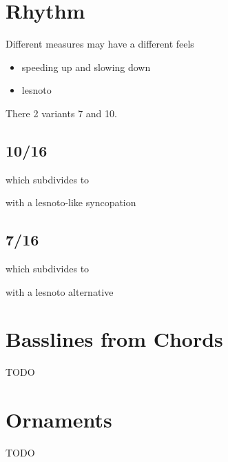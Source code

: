 

\section{Rhythm}
Different measures may have a different feels
\begin{itemize}[noitemsep]
\item speeding up and slowing down
\item lesnoto
\end{itemize}
There 2 variants 7 and 10.
\subsection{10/16}
\begin{center}
\end{center}
which subdivides to
\begin{center}
\end{center}
with a lesnoto-like syncopation
\begin{center}
\end{center}


\subsection{7/16}
\begin{center}
\end{center}
which subdivides to
\begin{center}
\end{center}
with a lesnoto alternative
\begin{center}
\end{center}

\section{Basslines from Chords}
TODO

\section{Ornaments}
TODO

